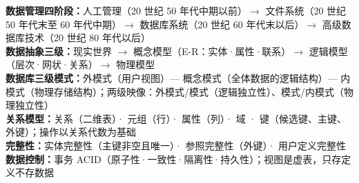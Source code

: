 \documentclass[a4paper,11pt]{article}
\begin{document}

\begin{knowmap}
\textbf{数据管理四阶段：}人工管理（20 世纪 50 年代中期以前）$\rightarrow$ 文件系统（20 世纪 50 年代末至 60 年代中期）$\rightarrow$ 数据库系统（20 世纪 60 年代末以后）$\rightarrow$ 高级数据库技术（20 世纪 80 年代以后）\\[2pt]
\textbf{数据抽象三级：}现实世界 $\rightarrow$ 概念模型（E-R：实体·属性·联系）$\rightarrow$ 逻辑模型（层次·网状·关系）$\rightarrow$ 物理模型\\[2pt]
\textbf{数据库三级模式：}外模式（用户视图）— 概念模式（全体数据的逻辑结构）— 内模式（物理存储结构）；两级映像：外模式/模式（逻辑独立性）、模式/内模式（物理独立性）\\[2pt]
\textbf{关系模型：}关系（二维表）· 元组（行）· 属性（列）· 域 · 键（候选键、主键、外键）；操作以关系代数为基础\\[2pt]
\textbf{完整性：}实体完整性（主键非空且唯一）· 参照完整性（外键）· 用户定义完整性\\[2pt]
\textbf{数据控制：}事务 ACID（原子性·一致性·隔离性·持久性）；视图是虚表，只存定义不存数据
\end{knowmap}
\end{document}
